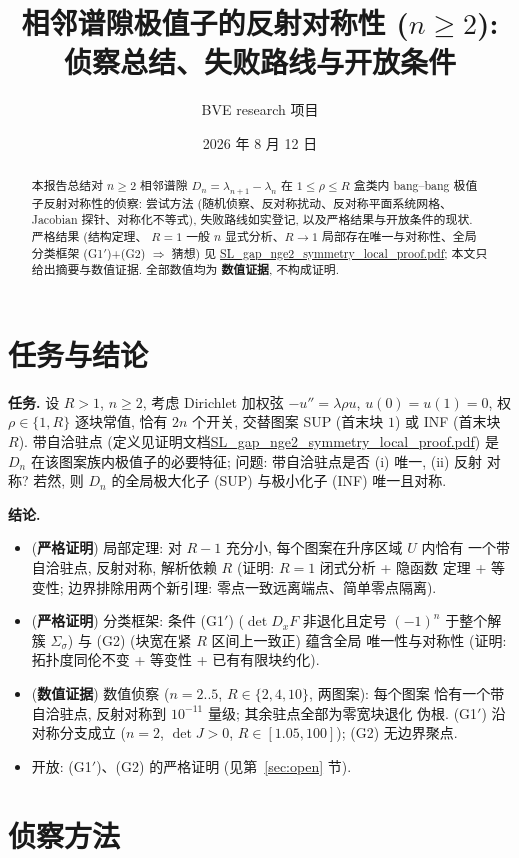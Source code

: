 \documentclass[UTF8]{ctexart}
\title{相邻谱隙极值子的反射对称性 ($n\ge2$):\\ 侦察总结、失败路线与开放条件}
\author{BVE research 项目}
\date{2026 年 8 月 12 日}
\newcommand{\STRICT}{\textbf{严格证明}}
\newcommand{\EVIDENCE}{\textbf{数值证据}}
\begin{document}
\maketitle

\begin{abstract}
本报告总结对 $n\ge2$ 相邻谱隙 $D_n=\lambda_{n+1}-\lambda_n$ 在
$1\le\rho\le R$ 盒类内 bang--bang 极值子反射对称性的侦察: 尝试方法
(随机侦察、反对称扰动、反对称平面系统网格、Jacobian 探针、对称化不等式),
失败路线如实登记, 以及严格结果与开放条件的现状. 严格结果 (结构定理、
$R=1$ 一般 $n$ 显式分析、$R\to1$ 局部存在唯一与对称性、全局分类框架
(G1$'$)+(G2) $\Rightarrow$ 猜想) 见
\url{SL_gap_nge2_symmetry_local_proof.pdf}; 本文只给出摘要与数值证据.
全部数值均为 \EVIDENCE, 不构成证明.
\end{abstract}

\section{任务与结论}

\textbf{任务.} 设 $R>1$, $n\ge2$, 考虑 Dirichlet 加权弦 $-u''=\lambda\rho u$,
$u(0)=u(1)=0$, 权 $\rho\in\{1,R\}$ 逐块常值, 恰有 $2n$ 个开关, 交替图案 SUP
(首末块 $1$) 或 INF (首末块 $R$). 带自洽驻点 (定义见证明文档\url{SL_gap_nge2_symmetry_local_proof.pdf}) 是
$D_n$ 在该图案族内极值子的必要特征; 问题: 带自洽驻点是否 (i) 唯一, (ii) 反射
对称? 若然, 则 $D_n$ 的全局极大化子 (SUP) 与极小化子 (INF) 唯一且对称.

\textbf{结论.}
\begin{itemize}
	\item (\STRICT) 局部定理: 对 $R-1$ 充分小, 每个图案在升序区域 $U$ 内恰有
	一个带自洽驻点, 反射对称, 解析依赖 $R$ (证明: $R=1$ 闭式分析 + 隐函数
	定理 + 等变性; 边界排除用两个新引理: 零点一致远离端点、简单零点隔离).
	\item (\STRICT) 分类框架: 条件 (G1$'$) ($\det D_xF$ 非退化且定号 $(-1)^n$
	于整个解簇 $\Sigma_\sigma$) 与 (G2) (块宽在紧 $R$ 区间上一致正) 蕴含全局
	唯一性与对称性 (证明: 拓扑度同伦不变 + 等变性 + 已有有限块约化).
	\item (\EVIDENCE) 数值侦察 ($n=2..5$, $R\in\{2,4,10\}$, 两图案): 每个图案
	恰有一个带自洽驻点, 反射对称到 $10^{-11}$ 量级; 其余驻点全部为零宽块退化
	伪根. (G1$'$) 沿对称分支成立 ($n=2$, $\det J>0$, $R\in[1.05,100]$);
	(G2) 无边界聚点.
	\item 开放: (G1$'$)、(G2) 的严格证明 (见第~\ref{sec:open} 节).
\end{itemize}

\section{侦察方法}\label{sec:methods}
\end{document}
